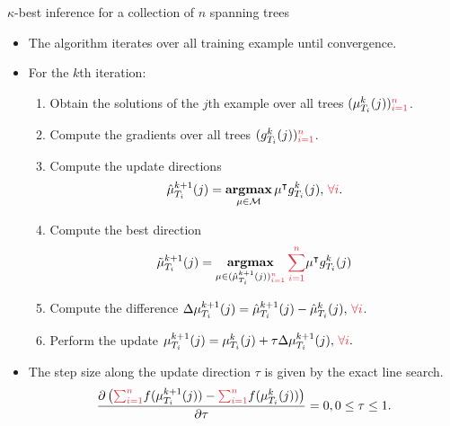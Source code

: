 \documentclass[first=dgreen,second=purple,logo=yellowexc]{aaltoslides}
\begin{document}
\begin{frame}{$\kappa$-best inference for a collection of $n$ spanning trees}
	\begin{itemize}\footnotesize
		\item The algorithm iterates over all training example until convergence.
		\item For the $k$th iteration:
		\begin{enumerate}\footnotesize
			\item Obtain the solutions of the $j$th example over all trees $(\vmu_{T_i}^k(j)){\color{aaltored}_{i=1}^n}$.
			\item Compute the gradients over all trees $(g_{T_i}^k(j)){\color{aaltored}_{i=1}^n}$.
			\item Compute the update directions
			\begin{align*}
				\hat{\vmu}_{T_i}^{k+1}(j) = \underset{\vmu\in\Mcal}{\argmax}\,\vmu\tp g_{T_i}^k(j),\,{\color{aaltored}\forall i}.
			\end{align*}
			\item Compute the best direction
			\begin{align*}
				\tilde{\vmu}_{T_i}^{k+1}(j) = \underset{\vmu\in(\hat{\vmu}_{T_i}^{k+1}(j)){\color{aaltored}_{i=1}^n}}{\argmax}\,{\color{aaltored}\sum_{i=1}^n}\vmu\tp g_{T_i}^k(j)
			\end{align*}
			\item Compute the difference $\Delta\vmu_{T_i}^{k+1}(j) = \hat{\vmu}_{T_i}^{k+1}(j) - \hat{\vmu}_{T_i}^{k}(j),\,{\color{aaltored}\forall i}$.
			\item Perform the update $\vmu_{T_i}^{k+1}(j) = \vmu_{T_i}^k(j) + \tau\Delta\vmu_{T_i}^{k+1}(j),\,{\color{aaltored}\forall i}.$
		\end{enumerate}
		\item The step size along the update direction $\tau$ is given by the exact line search.
		\begin{align*}\footnotesize
			\frac{\partial \left({\color{aaltored}\sum_{i=1}^n}f(\vmu_{T_i}^{k+1}(j))-{\color{aaltored}\sum_{i=1}^n}f(\vmu_{T_i}^k(j))\right)}{\partial \tau} = 0, 0\le\tau\le1.
		\end{align*}
	\end{itemize}
\end{frame}
\end{document}
